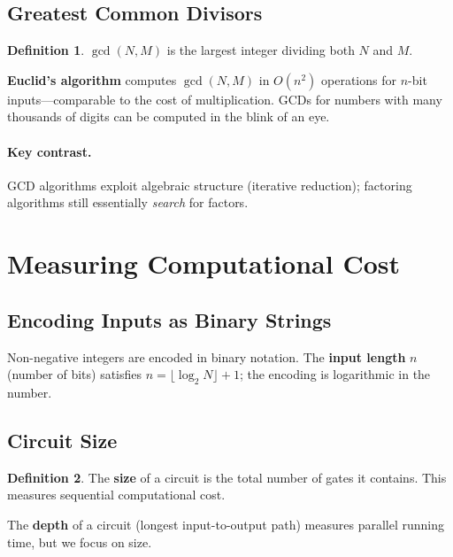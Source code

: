 \documentclass[11pt]{article}
\theoremstyle{definition}
\newtheorem{definition}{Definition}[section]
\begin{document}
\subsection{Greatest Common Divisors}

\begin{definition}
$\gcd(N,M)$ is the largest integer dividing both $N$ and $M$.
\end{definition}

\textbf{Euclid's algorithm} computes $\gcd(N,M)$ in $O(n^2)$ operations for $n$-bit inputs---comparable to the cost of multiplication.  GCDs for numbers with many thousands of digits can be computed in the blink of an eye.

\paragraph{Key contrast.}  GCD algorithms exploit algebraic structure (iterative reduction); factoring algorithms still essentially \emph{search} for factors.

\section{Measuring Computational Cost}

\subsection{Encoding Inputs as Binary Strings}

Non-negative integers are encoded in binary notation.  The \textbf{input length} $n$ (number of bits) satisfies $n=\lfloor\log_2 N\rfloor+1$; the encoding is logarithmic in the number.

\subsection{Circuit Size}

\begin{definition}
The \textbf{size} of a circuit is the total number of gates it contains.  This measures sequential computational cost.
\end{definition}

The \textbf{depth} of a circuit (longest input-to-output path) measures parallel running time, but we focus on size.
\end{document}
